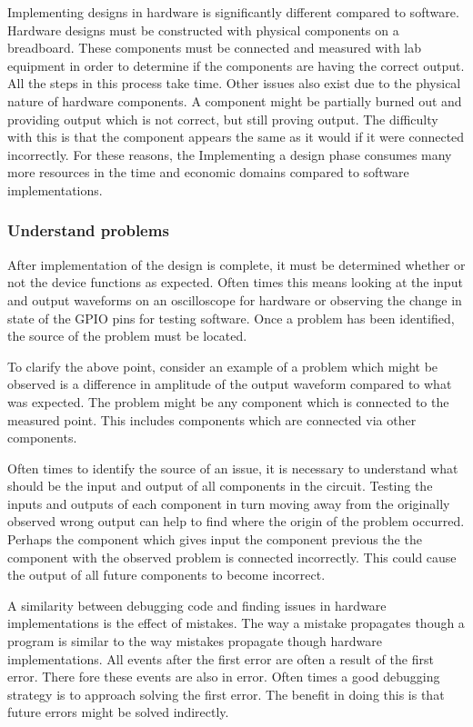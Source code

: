 \documentclass{article}	%
\begin{document}
\begin{multicols}{2}
Implementing designs in hardware is significantly different compared to software.
Hardware designs must be constructed with physical components on a breadboard.
These components must be connected and measured with lab equipment
in order to determine if the components are having the correct output.
All the steps in this process take time.
Other issues also exist due to the physical nature of 
hardware components.
A component might be partially burned out and providing output
which is not correct, but still proving output.
The difficulty with this is that the component appears
the same as it would if it were connected incorrectly.
For these reasons,
the Implementing a design phase 
consumes many more resources in the time and economic
domains compared to software implementations.

\subsubsection{Understand problems}
After implementation of the design is complete,
it must be determined whether or not the device functions
as expected.
Often times this means looking at the input and
output waveforms on an oscilloscope for hardware or
observing the change in state of the GPIO pins for
testing software.
Once a problem has been identified,
the source of the problem must be located.

To clarify the above point, consider 
an example of a problem which might be observed is
a difference in amplitude of the output waveform
compared to what was expected.
The problem might be any component which is
connected to the measured point.
This includes components which are connected
via other components.

Often times to identify the source of an issue,
it is necessary to understand what should be
the input and output of all components in the circuit.
Testing the inputs and outputs of each component in turn
moving away from the originally observed wrong output can
help to find where the origin of the problem occurred.
Perhaps the component which gives input the component
previous the the component with the observed problem
is connected incorrectly.
This could cause the output of all future components to become incorrect.

A similarity between debugging code and
finding issues in hardware implementations is
the effect of mistakes.
The way a mistake propagates though a
program is similar to the way mistakes
propagate though hardware implementations.
All events after the first error are
often a result of the first error.
There fore these events are also in error.
Often times a good debugging strategy is
to approach solving the first error.
The benefit in doing this is that future errors
might be solved indirectly.


\end{multicols}
\end{document}

